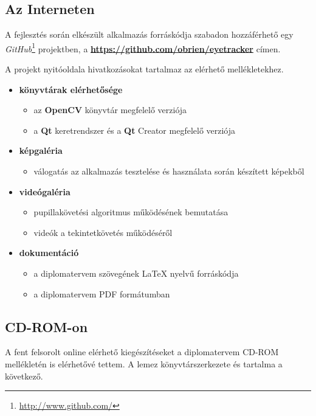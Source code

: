 \subsection{Az Interneten}

A fejlesztés során elkészült alkalmazás forráskódja szabadon hozzáférhető egy \emph{GitHub}\footnote{\url{http://www.github.com/}} projektben, a \textbf{\url{https://github.com/obrien/eyetracker}} címen.

A projekt nyitóoldala hivatkozásokat tartalmaz az elérhető mellékletekhez. 

\begin{itemize}
    \item \textbf{könyvtárak elérhetősége}
    \begin{itemize}
      \item az \textbf{OpenCV} könyvtár megfelelő verziója
      \item a \textbf{Qt} keretrendszer és a \textbf{Qt} Creator megfelelő verziója
    \end{itemize}
    
  \item \textbf{képgaléria}
    \begin{itemize}
      \item válogatás az alkalmazás tesztelése és használata során készített képekből
    \end{itemize}
    
  \item \textbf{videógaléria}
    \begin{itemize}
      \item pupillakövetési algoritmus működésének bemutatása
      \item videók a tekintetkövetés működéséről
    \end{itemize}

  \item \textbf{dokumentáció}
    \begin{itemize}
      \item a diplomatervem szövegének \LaTeX{} nyelvű forráskódja
      \item a diplomatervem PDF formátumban
    \end{itemize}
\end{itemize}

\subsection{CD-ROM-on}

A fent felsorolt online elérhető kiegészítéseket a diplomatervem CD-ROM mellékletén is elérhetővé tettem. A lemez könyvtárszerkezete és tartalma a következő.

